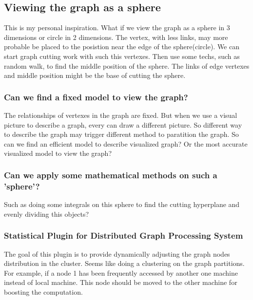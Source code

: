 \documentclass{article}
\begin{document}
	\subsection{Viewing the graph as a sphere}
	This is my personal inspiration. What if we view the graph as a sphere in 3 dimensions or circle in 2 dimensions. The vertex, with less links, may more probable be placed to the posistion near the edge of the sphere(circle). We can start graph cutting work with such this vertexes. Then use some techs, such as random walk, to find the middle position of the sphere. The links of edge vertexes and middle position might be the base of cutting the sphere.
	\subsubsection{Can we find a fixed model to view the graph?}
	The relationships of vertexes in the graph are fixed. But when we use a visual picture to describe a graph, every can draw a different picture. So different way to describe the graph may trigger different method to paratition the graph. So can we find an efficient model to describe visualized graph? Or the most accurate visualized model to view the graph?
	\subsubsection{Can we apply some mathematical methods on such a 'sphere'?}
	Such as doing some integrals on this sphere to find the cutting hyperplane and evenly dividing this objects?
	\subsubsection{Statistical Plugin for Distributed Graph Processing System}
	The goal of this plugin is to provide dynamically adjusting the graph nodes distribution in the cluster. Seems like doing a clustering on the graph partitions. For example, if a node 1 has been frequently accessed by another one machine instead of local machine. This node should be moved to the other machine for boosting the computation.
\end{document}
